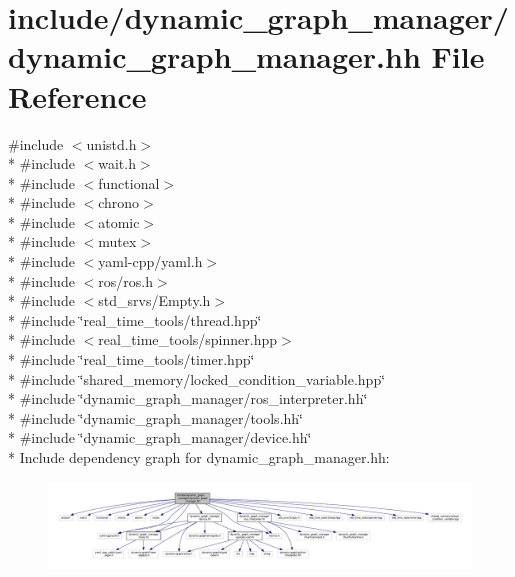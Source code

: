 \hypertarget{dynamic__graph__manager_8hh}{}\section{include/dynamic\+\_\+graph\+\_\+manager/dynamic\+\_\+graph\+\_\+manager.hh File Reference}
\label{dynamic__graph__manager_8hh}
{\ttfamily \#include $<$unistd.\+h$>$}\\*
{\ttfamily \#include $<$wait.\+h$>$}\\*
{\ttfamily \#include $<$functional$>$}\\*
{\ttfamily \#include $<$chrono$>$}\\*
{\ttfamily \#include $<$atomic$>$}\\*
{\ttfamily \#include $<$mutex$>$}\\*
{\ttfamily \#include $<$yaml-\/cpp/yaml.\+h$>$}\\*
{\ttfamily \#include $<$ros/ros.\+h$>$}\\*
{\ttfamily \#include $<$std\+\_\+srvs/\+Empty.\+h$>$}\\*
{\ttfamily \#include \char`\"{}real\+\_\+time\+\_\+tools/thread.\+hpp\char`\"{}}\\*
{\ttfamily \#include $<$real\+\_\+time\+\_\+tools/spinner.\+hpp$>$}\\*
{\ttfamily \#include \char`\"{}real\+\_\+time\+\_\+tools/timer.\+hpp\char`\"{}}\\*
{\ttfamily \#include \char`\"{}shared\+\_\+memory/locked\+\_\+condition\+\_\+variable.\+hpp\char`\"{}}\\*
{\ttfamily \#include \char`\"{}dynamic\+\_\+graph\+\_\+manager/ros\+\_\+interpreter.\+hh\char`\"{}}\\*
{\ttfamily \#include \char`\"{}dynamic\+\_\+graph\+\_\+manager/tools.\+hh\char`\"{}}\\*
{\ttfamily \#include \char`\"{}dynamic\+\_\+graph\+\_\+manager/device.\+hh\char`\"{}}\\*
Include dependency graph for dynamic\+\_\+graph\+\_\+manager.\+hh\+:
\nopagebreak
\begin{figure}[H]
\begin{center}
\leavevmode
\includegraphics[width=350pt]{dynamic__graph__manager_8hh__incl}
\end{center}
\end{figure}
